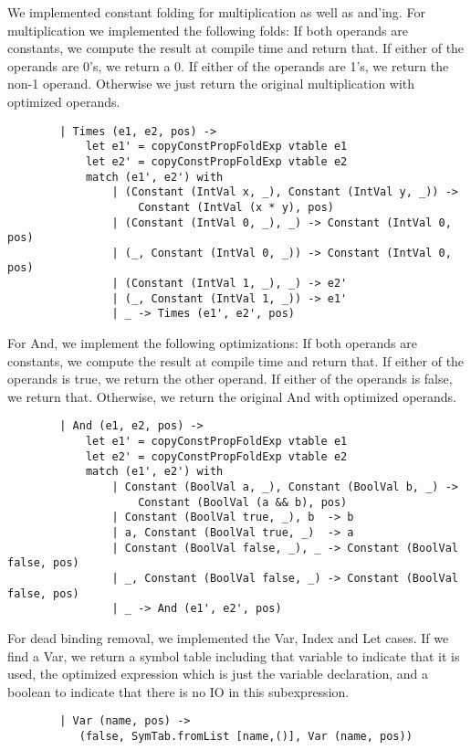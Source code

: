 We implemented constant folding for multiplication as well as and'ing. For multiplication we implemented the following folds:
If both operands are constants, we compute the result at compile time and return that.
If either of the operands are 0's, we return a 0.
If either of the operands are 1's, we return the non-1 operand.
Otherwise we just return the original multiplication with optimized operands.
\begin{verbatim}
        | Times (e1, e2, pos) ->
            let e1' = copyConstPropFoldExp vtable e1
            let e2' = copyConstPropFoldExp vtable e2
            match (e1', e2') with
                | (Constant (IntVal x, _), Constant (IntVal y, _)) ->
                    Constant (IntVal (x * y), pos)
                | (Constant (IntVal 0, _), _) -> Constant (IntVal 0, pos)
                | (_, Constant (IntVal 0, _)) -> Constant (IntVal 0, pos)
                | (Constant (IntVal 1, _), _) -> e2'
                | (_, Constant (IntVal 1, _)) -> e1'
                | _ -> Times (e1', e2', pos)
\end{verbatim}

For And, we implement the following optimizations:
If both operands are constants, we compute the result at compile time and return that.
If either of the operands is true, we return the other operand.
If either of the operands is false, we return that.
Otherwise, we return the original And with optimized operands.
\begin{verbatim} 
        | And (e1, e2, pos) ->
            let e1' = copyConstPropFoldExp vtable e1
            let e2' = copyConstPropFoldExp vtable e2
            match (e1', e2') with
                | Constant (BoolVal a, _), Constant (BoolVal b, _) ->
                    Constant (BoolVal (a && b), pos)
                | Constant (BoolVal true, _), b  -> b
                | a, Constant (BoolVal true, _)  -> a
                | Constant (BoolVal false, _), _ -> Constant (BoolVal false, pos)
                | _, Constant (BoolVal false, _) -> Constant (BoolVal false, pos)
                | _ -> And (e1', e2', pos)
\end{verbatim}


For dead binding removal, we implemented the Var, Index and Let cases. If we find a Var, we return a symbol table including that variable to indicate that it is used, the optimized expression which is just the variable declaration, and a boolean to indicate that there is no IO in this subexpression.
\begin{verbatim}
        | Var (name, pos) ->
           (false, SymTab.fromList [name,()], Var (name, pos))
\end{verbatim}

